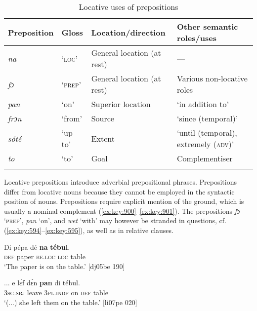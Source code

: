 \begin{table}
\caption{Locative uses of prepositions}
\label{tab:key:8.1}

\begin{tabularx}{\textwidth}{lllQ}
\lsptoprule
Preposition & Gloss & Location/direction & Other semantic roles/uses\\
\midrule 
\itshape na & ‘\textsc{loc}’ & General location (at rest) & {}---\\
\itshape fɔ & ‘\textsc{prep}’ & General location (at rest) & Various non-locative roles\\
\itshape pan & ‘on’ & Superior location & ‘in addition to’\\
\itshape frɔn & ‘from’ & Source & ‘since (temporal)’\\
\itshape sóté & ‘up to’ & Extent & ‘until (temporal), extremely (\textsc{adv})’\\
\itshape to & ‘to’ & Goal & Complementiser\\
\lspbottomrule
\end{tabularx}
\end{table}
Locative prepositions introduce adverbial prepositional phrases. Prepositions differ from locative nouns because they cannot be employed in the syntactic position of nouns. Prepositions require explicit mention of the ground, which is usually a nominal complement (\ref{ex:key:900}–\ref{ex:key:901}). The prepositions \textit{fɔ} ‘\textsc{prep}’, \textit{pan} ‘on’, and \textit{wet} ‘with’ may however be stranded in questions, cf. (\ref{ex:key:594}–\ref{ex:key:595}), as well as in relative clauses.


\ea%
    \label{ex:key:900}
    \gll Di  pépa  dé    \textbf{na}  \textbf{tébul}.\\
\textsc{def}  paper  \textsc{be.loc}  \textsc{loc}  table\\

\glt ‘The paper is on the table.’ [dj05be 190]
\z


\ea%
    \label{ex:key:901}
    \gll \op...\cp{}  e    lɛ́f    dɛ́n    \textbf{pan}  di  tébul.\\
{}  \textsc{3sg.sbj}  leave  \textsc{3pl.indp}  on  \textsc{def}  table\\

\glt ‘(...) she left them on the table.’ [li07pe 020]
\z

